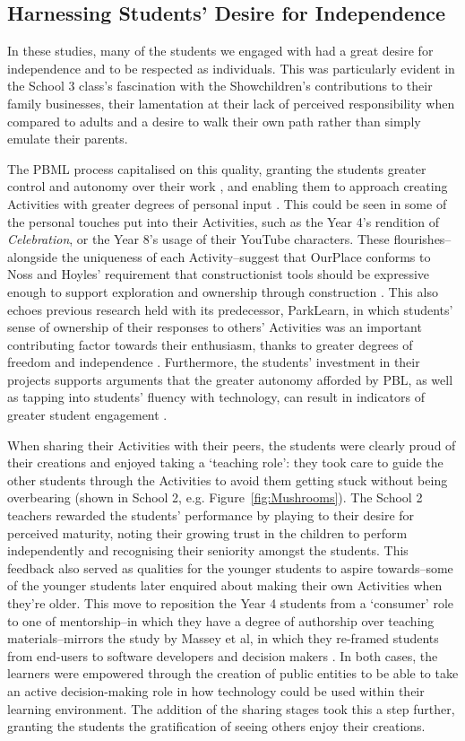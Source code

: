 \subsection{Harnessing Students' Desire for Independence}
In these studies, many of the students we engaged with had a great desire for independence and to be respected as individuals. This was particularly evident in the School 3 class's fascination with the Showchildren's contributions to their family businesses, their lamentation at their lack of perceived responsibility when compared to adults and a desire to walk their own path rather than simply emulate their parents.

The PBML process capitalised on this quality, granting the students greater control and autonomy over their work \cite{Noss2017, Wurdinger2007}, and enabling them to approach creating Activities with greater degrees of personal input \cite{Richardson2017}. This could be seen in some of the personal touches put into their Activities, such as the Year 4's rendition of \textit{Celebration}, or the Year 8's usage of their YouTube characters. These flourishes--alongside the uniqueness of each Activity--suggest that OurPlace conforms to Noss and Hoyles' requirement that constructionist tools should be expressive enough to support exploration and ownership through construction \cite{Noss2017}. This also echoes previous research held with its predecessor, ParkLearn, in which students' sense of ownership of their responses to others' Activities was an important contributing factor towards their enthusiasm, thanks to greater degrees of freedom and independence \cite{Richardson2018}. Furthermore, the students' investment in their projects supports arguments that the greater autonomy afforded by PBL, as well as tapping into students' fluency with technology, can result in indicators of greater student engagement \cite{Wurdinger2007, Bell2010}.

When sharing their Activities with their peers, the students were clearly proud of their creations and enjoyed taking a `teaching role': they took care to guide the other students through the Activities to avoid them getting stuck without being overbearing (shown in School 2, e.g. Figure~\ref{fig:Mushrooms}). The School 2 teachers rewarded the students' performance by playing to their desire for perceived maturity, noting their growing trust in the children to perform independently and recognising their seniority amongst the students. This feedback also served as qualities for the younger students to aspire towards--some of the younger students later enquired about making their own Activities when they're older. This move to reposition the Year 4 students from a `consumer' role to one of mentorship--in which they have a degree of authorship over teaching materials--mirrors the study by Massey et al, in which they re-framed students from end-users to software developers and decision makers \cite{Massey2006}. In both cases, the learners were empowered through the creation of public entities to be able to take an active decision-making role in how technology could be used within their learning environment. The addition of the sharing stages took this a step further, granting the students the gratification of seeing others enjoy their creations.
 
